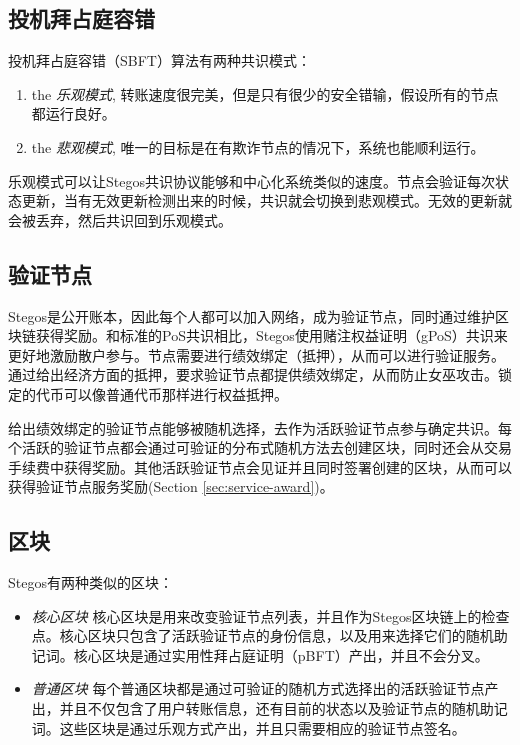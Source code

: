\documentclass[8pt,fleqn,openany]{book}
\begin{document}
\begin{CJK*}{UTF8}{gbsn}
\subsection{投机拜占庭容错}
投机拜占庭容错（SBFT）算法有两种共识模式：

\begin{enumerate}
	\item the \textit{乐观模式}, 转账速度很完美，但是只有很少的安全错输，假设所有的节点都运行良好。 
	\item the \textit{悲观模式}, 唯一的目标是在有欺诈节点的情况下，系统也能顺利运行。 
\end{enumerate}

乐观模式可以让Stegos共识协议能够和中心化系统类似的速度。节点会验证每次状态更新，当有无效更新检测出来的时候，共识就会切换到悲观模式。无效的更新就会被丢弃，然后共识回到乐观模式。

\subsection{验证节点}
Stegos是公开账本，因此每个人都可以加入网络，成为验证节点，同时通过维护区块链获得奖励。和标准的PoS共识相比，Stegos使用赌注权益证明（gPoS）共识来更好地激励散户参与。节点需要进行绩效绑定（抵押），从而可以进行验证服务。通过给出经济方面的抵押，要求验证节点都提供绩效绑定，从而防止女巫攻击。锁定的代币可以像普通代币那样进行权益抵押。

给出绩效绑定的验证节点能够被随机选择，去作为活跃验证节点参与确定共识。每个活跃的验证节点都会通过可验证的分布式随机方法去创建区块，同时还会从交易手续费中获得奖励。其他活跃验证节点会见证并且同时签署创建的区块，从而可以获得验证节点服务奖励(Section \ref{sec:service-award})。

\subsection{区块}\label{sec:blocks}
Stegos有两种类似的区块：

\begin{itemize}
	\item {\em 核心区块} 核心区块是用来改变验证节点列表，并且作为Stegos区块链上的检查点。核心区块只包含了活跃验证节点的身份信息，以及用来选择它们的随机助记词。核心区块是通过实用性拜占庭证明（pBFT）产出，并且不会分叉。
	\item {\em 普通区块} 每个普通区块都是通过可验证的随机方式选择出的活跃验证节点产出，并且不仅包含了用户转账信息，还有目前的状态以及验证节点的随机助记词。这些区块是通过乐观方式产出，并且只需要相应的验证节点签名。
\end{itemize}


\end{CJK*}
\end{document}
